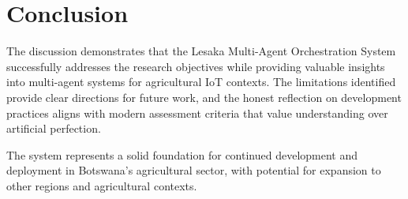 \section{Conclusion}

The discussion demonstrates that the Lesaka Multi-Agent Orchestration System successfully addresses the research objectives while providing valuable insights into multi-agent systems for agricultural IoT contexts. The limitations identified provide clear directions for future work, and the honest reflection on development practices aligns with modern assessment criteria that value understanding over artificial perfection.

The system represents a solid foundation for continued development and deployment in Botswana's agricultural sector, with potential for expansion to other regions and agricultural contexts.
